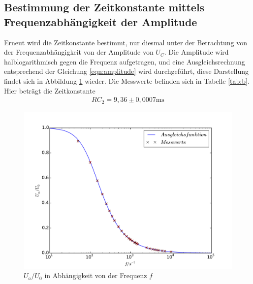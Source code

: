 \subsection{Bestimmung der Zeitkonstante mittels Frequenzabhängigkeit der Amplitude }
Erneut wird die Zeitkonstante bestimmt, nur diesmal unter
der Betrachtung von der Frequenzabhängigkeit von der Amplitude von $U_C$.
Die Amplitude wird halblogarithmisch gegen die Frequenz aufgetragen, und eine Ausgleichsrechnung
entsprechend der Gleichung \eqref{eqn:amplitude} wird durchgeführt,
diese Darstellung findet sich in Abbildung \ref{abb:b} wieder.
Die Messwerte befinden sich in Tabelle \ref{tab:b}.
Hier beträgt die Zeitkonstante
\begin{align*}
RC_\mathrm{2}=9,36 \pm 0,0007\si{\milli\second}
\end{align*}
\begin{figure}[h]
  \centering
  \includegraphics[width=1\textwidth]{b.pdf}
  \caption{$U_a/U_0$ in Abhängigkeit von der Frequenz $f$}
  \label{abb:b}
\end{figure}
